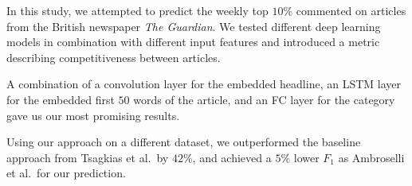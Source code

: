 In this study, we attempted to predict the weekly top $10\%$ commented on articles from the British newspaper \textit{The Gu\-ar\-di\-an}. 
We tested different deep learning models in combination with different input features and introduced a metric describing competitiveness between articles.

A combination of a convolution layer for the embedded headline, an LSTM layer for the embedded first $50$ words of the article, and an FC layer for the category gave us our most promising results.

Using our approach on a different dataset, we outperformed the baseline approach from Tsagkias et al.\ by $42\%$, and achieved a $5\%$ lower $F_1$ as Ambroselli et al.\ for our prediction.